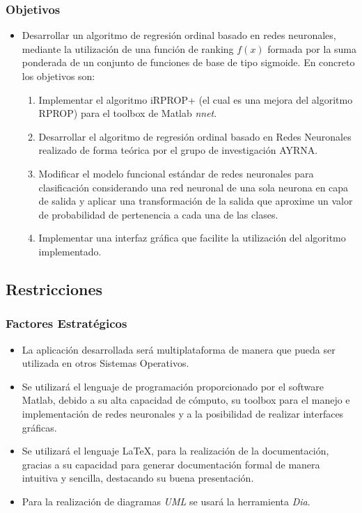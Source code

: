 \documentclass[compress,allowframebreaks]{beamer}
\begin{document}
			\begin{frame}
				\frametitle{\normalsize Objetivos}

				\begin{itemize}\justifying
					\item Desarrollar un algoritmo de regresión ordinal basado en redes neuronales, mediante la utilización de una función de ranking $f(x)$ formada por la suma ponderada de un conjunto de funciones
de base de tipo sigmoide. En concreto los objetivos son:\\
					\begin{enumerate}\justifying
						\item Implementar el algoritmo iRPROP+ (el cual es una mejora del algoritmo
RPROP) para el toolbox de Matlab \textit{nnet}.
						\item Desarrollar el algoritmo de regresión ordinal basado en Redes Neuronales realizado de forma teórica por el grupo de investigación AYRNA.
						\item Modificar el modelo funcional estándar de redes neuronales
para clasificación considerando una red neuronal de una sola neurona en capa de salida y aplicar una transformación de la salida que aproxime un valor de probabilidad de pertenencia a cada una de las clases.
				 		\item Implementar una interfaz gráfica que facilite la utilización del algoritmo
implementado.
					\end{enumerate}
				\end{itemize}
			\end{frame}

		\subsection{Restricciones}

			\begin{frame}
				\frametitle{\normalsize Factores Estratégicos}

				\begin{itemize}\justifying
					\item La aplicación desarrollada será multiplataforma de manera que pueda ser utilizada en otros Sistemas Operativos.
					\item Se utilizará el lenguaje de programación proporcionado por el software Matlab, debido a su alta capacidad de cómputo, su toolbox para el manejo e implementación de redes neuronales y a la posibilidad de realizar interfaces gráficas.
					\item Se utilizará el lenguaje \LaTeX, para la realización de la documentación, gracias a su capacidad para generar documentación formal de manera intuitiva y sencilla, destacando su buena presentación.
					\item Para la realización de diagramas \textit{UML} se usará la herramienta \textit{Dia}.
				\end{itemize}
			\end{frame}
\end{document}
